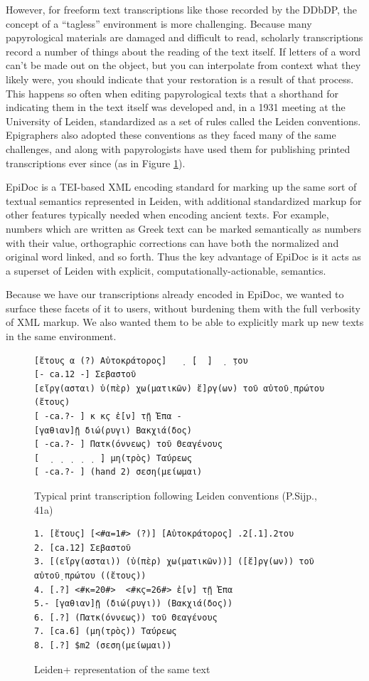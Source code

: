 \documentclass[]{article}
\begin{document}
However, for freeform text transcriptions like those recorded by the DDbDP, the concept of a “tagless” environment is more challenging. Because many papyrological materials are damaged and difficult to read, scholarly transcriptions record a number of things about the reading of the text itself. If letters of a word can't be made out on the object, but you can interpolate from context what they likely were, you should indicate that your restoration is a result of that process. This happens so often when editing papyrological texts that a shorthand for indicating them in the text itself was developed  and, in a 1931 meeting at the University of Leiden, standardized as a set of rules called the Leiden conventions. Epigraphers also adopted these conventions as they faced many of the same challenges, and along with papyrologists have used them for publishing printed transcriptions ever since (as in Figure \ref{leiden}).

EpiDoc is a TEI-based XML encoding standard for marking up the same sort of textual semantics represented in Leiden, with additional standardized markup for other features typically needed when encoding ancient texts. For example, numbers which are written as Greek text can be marked semantically as numbers with their value, orthographic corrections can have both the normalized and original word linked, and so forth. Thus the key advantage of EpiDoc is it acts as a superset of Leiden with explicit, computationally-actionable, semantics.

Because we have our transcriptions already encoded in EpiDoc, we wanted to surface these facets of it to users, without burdening them with the full verbosity of XML markup. We also wanted them to be able to explicitly mark up new texts in the same environment.

\begin{figure}[!ht]
    \begin{verbatim}
[ἔτους α (?) Αὐτοκράτορος]   ̣  ̣[  ̣]  ̣  ̣του 
[- ca.12 -] Σεβαστοῦ 
[εἴργ(ασται) ὑ(πὲρ) χω(ματικῶν) ἔ]ργ(ων) τοῦ αὐτοῦ̣ πρώτου (ἔτους) 
[ -ca.?- ] κ κϛ ἐ[ν] τῇ Ἐπα -
[γαθιαν]ῇ διώ(ρυγι) Βακχιά(δος) 
[ -ca.?- ] Πατκ(όννεως) τοῦ Θεαγένους 
[  ̣  ̣  ̣  ̣  ̣  ̣] μη(τρὸς) Ταύρεως 
[ -ca.?- ] (hand 2) σεση(μείωμαι)
    \end{verbatim}
    \caption{Typical print transcription following Leiden conventions (P.Sijp., 41a)\label{leiden}}
\end{figure}\nocite{psijp}

\begin{figure}[!h]
    \begin{verbatim}
1. [ἔτους] [<#α=1#> (?)] [Αὐτοκράτορος] .2[.1].2του
2. [ca.12] Σεβαστοῦ
3. [(εἴργ(ασται)) (ὑ(πὲρ) χω(ματικῶν))] ([ἔ]ργ(ων)) τοῦ αὐτοῦ̣ πρώτου ((ἔτους))
4. [.?] <#κ=20#>  <#κϛ=26#> ἐ[ν] τῇ Ἐπα
5.- [γαθιαν]ῇ (διώ(ρυγι)) (Βακχιά(δος))
6. [.?] (Πατκ(όννεως)) τοῦ Θεαγένους
7. [ca.6] (μη(τρὸς)) Ταύρεως
8. [.?] $m2 (σεση(μείωμαι))
    \end{verbatim}
    \caption{Leiden+ representation of the same text\label{leidenp}}
\end{figure}
\end{document}
